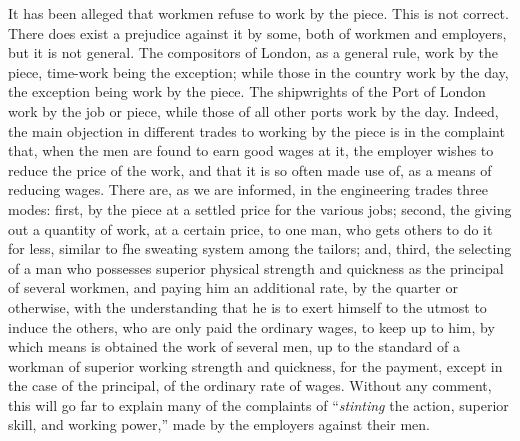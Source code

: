 It has been alleged that workmen refuse to work by the piece. This is
not correct. There does exist a prejudice against it by some, both of
workmen and employers, but it is not general. The compositors of London,
as a general rule, work by the piece, time-work being the exception;
while those in the country work by the day, the exception being work by
the piece. The shipwrights of the Port of London work by the job or
piece, while those of all other ports work by the day. Indeed, the main
objection in different trades to working by the piece is in the
complaint that, when the men are found to earn good wages at it, the
employer wishes to reduce the price of the work, and that it is so often
made use of, as a means of reducing wages. There are, as we are
informed, in the engineering trades three modes: first, by the piece at
a settled price for the various jobs; second, the giving out a quantity
of work, at a certain price, to one man, who gets others to do it for
less, similar to fhe sweating system among the tailors; and, third, the
selecting of a man who possesses superior physical strength and
quickness as the principal of several workmen, and paying him an
additional rate, by the quarter or otherwise, with the understanding
that he is to exert himself to the utmost to induce the others, who are
only paid the ordinary wages, to keep up to him, by which means is
obtained the work of several men, up to the standard of a workman of
superior working strength and quickness, for the payment, except in the
case of the principal, of the ordinary rate of wages. Without any
comment, this will go far to explain many of the complaints of
``\textit{stinting} the action, superior skill, and working power,''
made by the employers against their men.